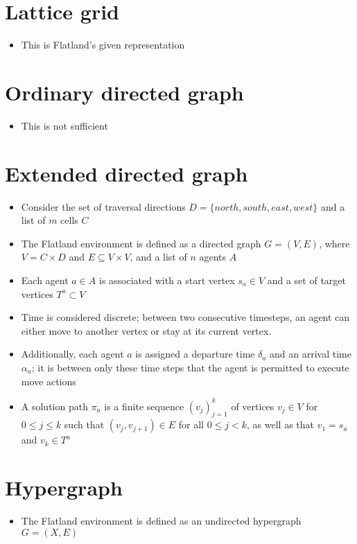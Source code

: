 
\section{Lattice grid}\label{sec:lattice_grid}
\begin{itemize}
	\item This is Flatland's given representation
\end{itemize}


\section{Ordinary directed graph}\label{sec:directed_graph}
\begin{itemize}
	\item This is not sufficient
\end{itemize}

\section{Extended directed graph}\label{sec:directed_graph}
\begin{itemize}
	\item Consider the set of traversal directions $D = \{north, south, east, west\}$  and a list of $m$ cells $C$
	\item The Flatland environment is defined as a directed graph $G = (V,E)$, where $V = C \times D$ and $E \subseteq V \times V$, and a list of $n$ agents $A$
	\item Each agent $a \in A$ is associated with a start vertex $s_a \in V$ and a set of target vertices $T^a \subset V$
	\item Time is considered discrete; between two consecutive timesteps, an agent can either move to another vertex or stay at its current vertex. 
	\item Additionally, each agent $a$ is assigned a departure time $\delta_a$ and an arrival time $\alpha_a$; it is between only these time steps that the agent is permitted to execute move actions
	\item A solution path $\pi_a$ is a finite sequence $(v_j)_{j=1}^k$ of vertices $v_j \in V$ for $0 \leq j \leq k$ such that $(v_j,v_{j+1}) \in E$ for all $0 \leq j < k$, as well as that $v_1 = s_a$ and $v_k \in T^a$
\end{itemize}

\section{Hypergraph}\label{sec:hypergraph}
\begin{itemize}
	\item The Flatland environment is defined as an undirected hypergraph $G = (X,E)$
\end{itemize}
